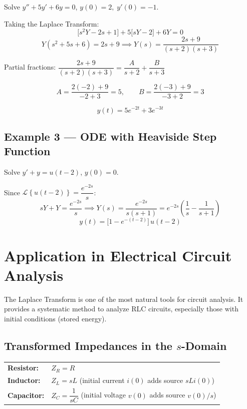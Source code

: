 \documentclass[12pt]{article}
\newcommand{\Lap}[1]{\mathcal{L}\!\left\{#1\right\}}
\begin{document}
\begin{examplebox}
Solve $y'' + 5y' + 6y = 0$, \quad $y(0)=2,\; y'(0)=-1$.

\medskip
Taking the Laplace Transform:
\[
  \bigl[s^2Y - 2s + 1\bigr] + 5\bigl[sY - 2\bigr] + 6Y = 0
\]
\[
  Y(s^2 + 5s + 6) = 2s + 9 \implies Y(s) = \frac{2s+9}{(s+2)(s+3)}
\]

Partial fractions: $\dfrac{2s+9}{(s+2)(s+3)} = \dfrac{A}{s+2} + \dfrac{B}{s+3}$

\[
  A = \frac{2(-2)+9}{-2+3} = 5, \qquad B = \frac{2(-3)+9}{-3+2} = 3
\]

\[
  \boxed{y(t) = 5e^{-2t} + 3e^{-3t}}
\]
\end{examplebox}

\subsection*{Example 3 --- ODE with Heaviside Step Function}

\begin{examplebox}
Solve $y' + y = u(t-2)$, \quad $y(0) = 0$.

\medskip
Since $\Lap{u(t-2)} = \dfrac{e^{-2s}}{s}$:
\[
  sY + Y = \frac{e^{-2s}}{s} \implies Y(s) = \frac{e^{-2s}}{s(s+1)} = e^{-2s}\left(\frac{1}{s} - \frac{1}{s+1}\right)
\]
\[
  \boxed{y(t) = \bigl[1 - e^{-(t-2)}\bigr]\,u(t-2)}
\]
\end{examplebox}

\newpage

\section{Application in Electrical Circuit Analysis}

The Laplace Transform is one of the most natural tools for circuit analysis. It provides a
systematic method to analyze RLC circuits, especially those with initial conditions (stored energy).

\subsection*{Transformed Impedances in the $s$-Domain}

\begin{conceptbox}
\begin{tabular}{lp{9cm}}
\textbf{Resistor:}   & $Z_R = R$ \\[4pt]
\textbf{Inductor:}   & $Z_L = sL$ \quad (initial current $i(0)$ adds source $sLi(0)$) \\[4pt]
\textbf{Capacitor:}  & $Z_C = \dfrac{1}{sC}$ \quad (initial voltage $v(0)$ adds source $v(0)/s$) \\
\end{tabular}
\end{conceptbox}
\end{document}

